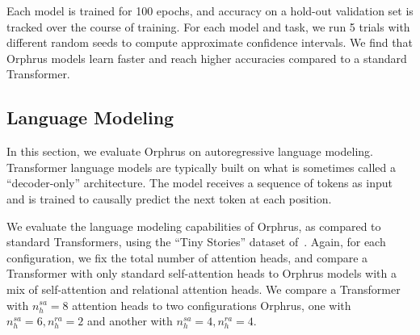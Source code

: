 Each model is trained for 100 epochs, and accuracy on a hold-out validation set is tracked over the course of training. For each model and task, we run 5 trials with different random seeds to compute approximate confidence intervals. We find that Orphrus models learn faster and reach higher accuracies compared to a standard Transformer.


\subsection{Language Modeling}\label{ssec:tiny_stories}

In this section, we evaluate Orphrus on autoregressive language modeling. Transformer language models are typically built on what is sometimes called a ``decoder-only'' architecture. The model receives a sequence of tokens as input and is trained to causally predict the next token at each position.

We evaluate the language modeling capabilities of Orphrus, as compared to standard Transformers, using the ``Tiny Stories'' dataset of~\citet{eldanTinyStoriesHowSmall2023}. Again, for each configuration, we fix the total number of attention heads, and compare a Transformer with only standard self-attention heads to Orphrus models with a mix of self-attention and relational attention heads. We compare a Transformer with $n_h^{sa} = 8$ attention heads to two configurations Orphrus, one with $n_h^{sa} = 6, n_h^{ra} = 2$ and another with $n_h^{sa} = 4, n_h^{ra} = 4$.


